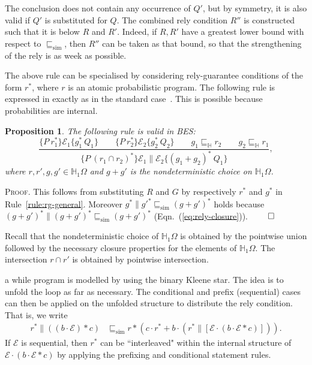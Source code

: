 \documentclass[review]{elsart}
\newtheorem{proposition}[definition]{Proposition}
\newenvironment{proof}{\par
\noindent
\textsc{Proof. }
\noindent}{\hfill\(\qed\)}
\renewcommand{\H}{\mathbb{H}}
\newcommand{\EE}{\mathcal{E}}
\newcommand{\triple}[3]{\{#1\}#2\{#3\}}
\newcommand{\bks}{*}
\newcommand{\refby}{\sqsubseteq}
\newcommand{\refbyh}{\sqsubseteq_{\mathbb{H}}}
\newcommand{\simref}{\refby_{\mathrm{sim}}}
\newcommand{\Eqn}[1]{Eqn.~(\ref{#1})}
\begin{document}
The conclusion does not contain any occurrence of $Q'$, but by symmetry, it is also valid if $Q'$ is substituted for $Q$. The combined rely condition $R''$ is constructed such that it is below $R$ and $R'$. Indeed, if $R,R'$ have a greatest lower bound with respect to $\simref$, then $R''$ can be taken as that bound, so that the strengthening of the rely is as week as possible. 

The above rule can be specialised by considering rely-guarantee conditions of the form $r^{\bks}$, where $r$ is an atomic probabilistic program. The following rule is expressed in exactly as in the standard case~\cite{Hoa11}. This is possible because probabilities are internal.

\begin{proposition}\label{pro:rule1}
The following rule is valid in BES:
\begin{equation}\label{rule:rg-atom-rely}
\frac{\triple{P\ r_1^{\bks}}{\EE_1}{g_1^{\bks}\ Q_1}\qquad \triple{P\ r_2^{\bks}}{\EE_2}{g_2^{\bks}\ Q_2}\qquad g_1\refbyh r_2\qquad g_2\refbyh r_1}{\triple{P\ (r_1{\cap} r_2)^{\bks}}{\EE_1\|\EE_2}{(g_1 {+} g_2)^{\bks}\ Q_1}},
\end{equation}
where $r,r',g,g'{\in}\H_1\Omega$ and $g{+}g'$ is the nondeterministic choice on $\H_1\Omega$.
\end{proposition}

\begin{proof}
This follows from substituting $R$ and $G$ by respectively $r^{\bks}$ and $g^{\bks}$ in Rule~\ref{rule:rg-general}. Moreover $g^{\bks}\|g'^{\bks}\simref (g{+} g')^{\bks}$ holds because $(g{+}g')^{\bks}\|(g{+}g')^{\bks}\simref (g{+}g')^{\bks}$ (\Eqn{eq:rely-closure}).
\end{proof}

Recall that the nondeterministic choice of $\H_1\Omega$ is obtained by the pointwise union followed by the necessary closure properties for the elements of $\H_1\Omega$. The intersection $r{\cap} r'$ is obtained by pointwise intersection.

a while program is modelled by using the binary Kleene star. The idea is to unfold the loop as far as necessary. The conditional and prefix (sequential) cases can then be applied on the unfolded structure to distribute the rely condition. That is, we write 
\begin{align*}\label{rule:while}
r^{\bks}\|((b{\cdot} \EE){\bks} c) & \simref r{\bks}(c{\cdot} r^{\bks} {+} b{\cdot} (r^{\bks}\|[\EE{\cdot}(b{\cdot}\EE{\bks} c)])).
\end{align*}
If $\EE$ is sequential, then $r^{\bks}$ can be ``interleaved" within the internal structure of $\EE{\cdot}(b{\cdot}\EE{\bks} c)$ by applying the prefixing and conditional statement rules.
\end{document}
